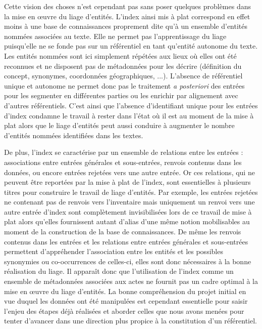 \documentclass[a4paper,12pt,twoside]{book}
\begin{document}
	Cette vision des choses n'est cependant pas sans poser quelques problèmes dans la mise en œuvre du liage d'entités. L'index ainsi mis à plat correspond en effet moins à une base de connaissances proprement dite qu'à un ensemble d'entités nommées associées au texte. Elle ne permet pas l'apprentissage du liage puisqu'elle ne se fonde pas sur un référentiel en tant qu'entité autonome du texte. Les entités nommées sont ici simplement répétées aux lieux où elles ont été reconnues et ne disposent pas de métadonnées pour les décrire (définition du concept, synonymes, coordonnées géographiques, ...). L'absence de référentiel unique et autonome ne permet donc pas le traitement \textit{a posteriori} des entrées pour les segmenter en différentes parties ou les enrichir par alignement avec d'autres référentiels. C'est ainsi que l'absence d'identifiant unique pour les entrées d'index condamne le travail à rester dans l'état où il est au moment de la mise à plat alors que le liage d'entités peut aussi conduire à augmenter le nombre d'entités nommées identifiées dans les textes.
	
	De plus, l'index se caractérise par un ensemble de relations entre les entrées : associations entre entrées générales et sous-entrées, renvois contenus dans les données, ou encore entrées rejetées vers une autre entrée. Or ces relations, qui ne peuvent être reportées par la mise à plat de l'index, sont essentielles à plusieurs titres pour construire le travail de liage d'entités.  Par exemple, les entrées rejetées ne contenant pas de renvois vers l'inventaire mais uniquement un renvoi vers une autre entrée d'index sont complètement invisibilisées lors de ce travail de mise à plat alors qu'elles fournissent autant d'alias d'une même notion mobilisables au moment de la construction de la base de connaissances. De même les renvois contenus dans les entrées et les relations entre entrées générales et sous-entrées permettent d'appréhender l'association entre les entités et les possibles synonymies ou co-occurrences de celles-ci, elles sont donc nécessaires à la bonne réalisation du liage. Il apparaît donc que l'utilisation de l'index comme un ensemble de métadonnées associées aux actes ne fournit pas un cadre optimal à la mise en œuvre du liage d'entités. La bonne compréhension du projet initial en vue duquel les données ont été manipulées est cependant essentielle pour saisir l'enjeu des étapes déjà réalisées et aborder celles que nous avons menées pour tenter d'avancer dans une direction plus propice à la constitution d'un référentiel.
	
\end{document}
